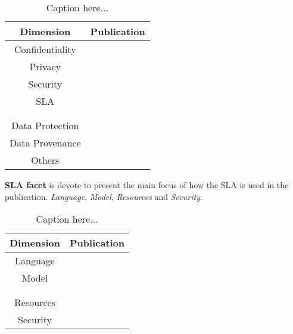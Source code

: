 \begin{description}
\begin{table}[h]
\caption{Caption here...}
\begin{center}
\begin{tabular}{|c|c|}
\hline 
\textbf{Dimension} & \textbf{Publication} \\ 
\hline 
Confidentiality & \cite{024,104,109,111} \\ 
\hline 
Privacy & \cite{007,024,047,067,068,095,096,109,111,113} \\ 
\hline 
Security & \cite{065,081,093,109,112,113} \\ 
\hline 
SLA  & \cite{001,002,007,008,009,011,012,013,014,015,016,017,018,019,020,021,022,023,024,025,026} \\ 
     & \cite{027,028,029,030,031,032,033,034,035,036,037,038,039,040,041,042,043,044,045,046,047} \\
     & \cite{048,049,050,051,052,053,054,055,056,057,058,059,060,061,062,063,064,065} \\
\hline 
Data Protection & \cite{047,104,106} \\ 
\hline 
Data Provenance & \cite{012} \\ 
\hline 
Others & \cite{071,093,100} \\ 
\hline 
\end{tabular}
\end{center}
\end{table}
\item \textbf{SLA facet} is devote to present the main focus of how the SLA is used in the publication.  \textit{Language}, \textit{Model}, \textit{Resources} and \textit{Security}.
\begin{table}[h]
\caption{Caption here...}
\begin{center}
\begin{tabular}{|c|c|}
\hline 
\textbf{Dimension} & \textbf{Publication} \\ 
\hline 
Language & \cite{003,037,039,041,055,056,061} \\ 
\hline 
Model & \cite{001,002,003,005,006,007,008,009,010,012,013,014,015,016,017,018,019,020,021,022,023,024} \\ 
      & \cite{026,027,028,029,030,031,032,033,035,036,038,040,042,043,044,045,046,047,048,049,050,051} \\ 
      & \cite{053,054,055,057,058,059,060,061,063} \\ 
\hline 
Resources & \cite{053,064,110} \\ 
\hline 
Security & \cite{011,025,034,035,038,049,050,052,062,065,081,093,109,112,113} \\ 

\end{tabular}
\end{center}
\end{table}
\end{description}

